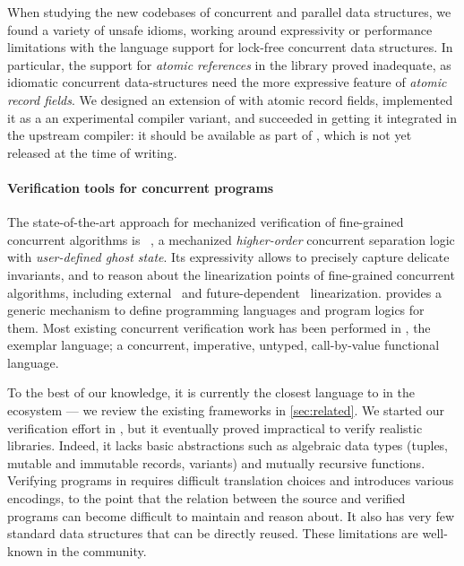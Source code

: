 When studying the new codebases of concurrent and parallel data structures, we found a variety of unsafe idioms, working around expressivity or performance limitations with the \OCaml language support for lock-free concurrent data structures.
In particular, the support for \emph{atomic references} in the \OCaml library proved inadequate, as idiomatic concurrent data-structures need the more expressive feature of \emph{atomic record fields}.
We designed an extension of \OCaml with atomic record fields, implemented it as a an experimental compiler variant, and succeeded in getting it integrated in the upstream \OCaml compiler: it should be available as part of , which is not yet released at the time of writing.

\paragraph{Verification tools for concurrent programs}

The state-of-the-art approach for mechanized verification of fine-grained concurrent algorithms is \Iris~\citep*{DBLP:journals/jfp/JungKJBBD18}, a mechanized \emph{higher-order} concurrent separation logic with \emph{user-defined ghost state}.
Its expressivity allows to precisely capture delicate invariants, and to reason about the linearization points of fine-grained concurrent algorithms, including external~\citep*{DBLP:conf/cpp/VindumFB22} and future-dependent~\citep*{DBLP:journals/pacmpl/JungLPRTDJ20,DBLP:conf/cpp/VindumB21,DBLP:conf/osdi/Chang0STKZ23} linearization.
\Iris provides a generic mechanism to define programming languages and program logics for them. Most existing \Iris concurrent verification work has been performed in \HeapLang, the exemplar \Iris language; a concurrent, imperative, untyped, call-by-value functional language.

To the best of our knowledge, it is currently the closest language to \OCamlFive in the \Iris ecosystem --- we review the existing frameworks in \cref{sec:related}.
We started our verification effort in \HeapLang, but it eventually proved impractical to verify realistic \OCaml libraries.
Indeed, it lacks basic abstractions such as algebraic data types (tuples, mutable and immutable records, variants) and mutually recursive functions.
Verifying \OCaml programs in \HeapLang requires difficult translation choices and introduces various encodings, to the point that the relation between the source and verified programs can become difficult to maintain and reason about.
It also has very few standard data structures that can be directly reused.
These limitations are well-known in the \Iris community.

